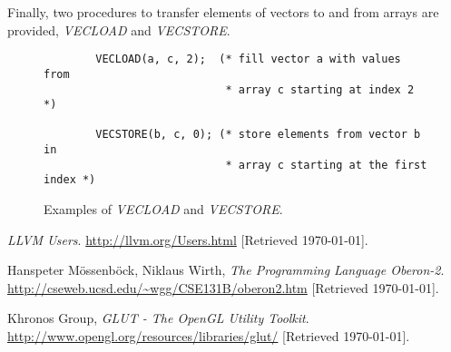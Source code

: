 \documentclass[a4paper,11pt]{article}
\begin{document}
    \noindent
    Finally, two procedures to transfer elements of vectors to and from arrays are provided, \emph{VECLOAD} and \emph{VECSTORE}.

    \begin{figure}[!htbp]
    \begin{lstlisting}
        VECLOAD(a, c, 2);  (* fill vector a with values from
                            * array c starting at index 2    *)

        VECSTORE(b, c, 0); (* store elements from vector b in
                            * array c starting at the first index *)
    \end{lstlisting}
    \caption{Examples of \emph{VECLOAD} and \emph{VECSTORE}.}
    \end{figure}

    \newpage
    \begin{thebibliography}{9}
            \emph{LLVM Users}. \newline
            \url{http://llvm.org/Users.html}
            [Retrieved \today].

            Hanspeter M\"{o}ssenb\"{o}ck, Niklaus Wirth,
            \emph{The Programming Language Oberon-2}. \newline
            \url{http://cseweb.ucsd.edu/~wgg/CSE131B/oberon2.htm}
            [Retrieved \today].

            Khronos Group,
            \emph{GLUT - The OpenGL Utility Toolkit}. \newline
            \url{http://www.opengl.org/resources/libraries/glut/}
            [Retrieved \today].

    \end{thebibliography}
\end{document}
